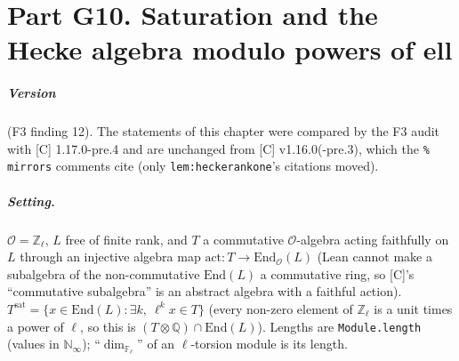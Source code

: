 
\chapter{Part G10. Saturation and the Hecke algebra modulo powers of ell}\label{ch:saturation}

\paragraph{Version} (F3 finding 12). The statements of this chapter were compared by the F3 audit with [C] 1.17.0-pre.4 and are
unchanged from [C] v1.16.0(-pre.3), which the \verb|% mirrors| comments cite (only \texttt{lem:heckerankone}'s citations moved).

\paragraph{Setting.} $\mathcal O=\mathbb Z_\ell$, $L$ free of finite rank, and $T$ a commutative $\mathcal O$-algebra acting
faithfully on $L$ through an injective algebra map $\mathrm{act}\colon T\to\mathrm{End}_{\mathcal O}(L)$ (Lean cannot make a
subalgebra of the non-commutative $\mathrm{End}(L)$ a commutative ring, so [C]'s ``commutative subalgebra'' is an abstract
algebra with a faithful action). $T^{\mathrm{sat}}=\{x\in\mathrm{End}(L):\exists k,\ \ell^kx\in T\}$ (every non-zero element of
$\mathbb Z_\ell$ is a unit times a power of $\ell$, so this is $(T\otimes\mathbb Q)\cap\mathrm{End}(L)$). Lengths are
\texttt{Module.length} (values in $\mathbb N_\infty$); ``$\dim_{\mathbb F_\ell}$'' of an $\ell$-torsion module is its length.

